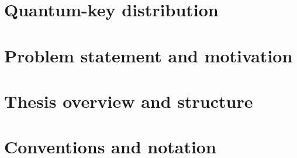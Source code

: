 \section{Quantum-key distribution}


\section{Problem statement and motivation}


\section{Thesis overview and structure}


\section{Conventions and notation}

